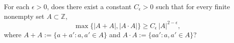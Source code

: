 For each $\epsilon>0$, does there exist a constant $C_\epsilon>0$ such that for every finite nonempty set $A\subset\mathbb{Z}$,
\[
\max\{|A+A|,|A\cdot A|\} \ge C_\epsilon\, |A|^{2-\epsilon},
\]
where $A+A:=\{a+a':a,a'\in A\}$ and $A\cdot A:=\{aa':a,a'\in A\}$?
